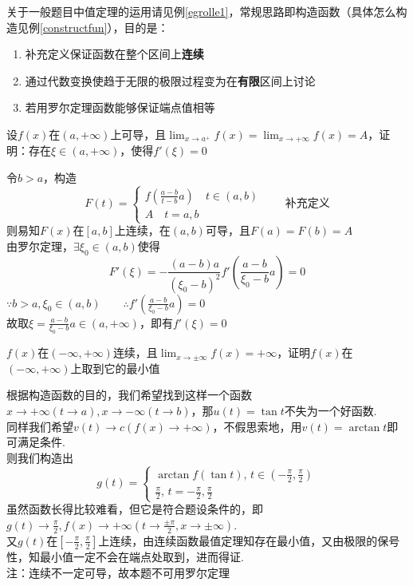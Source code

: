 关于一般题目中值定理的运用请见例\ref{egrolle1}，常规思路即构造函数（具体怎么构造见例\ref{constructfun}），目的是：
\begin{enumerate}
	\item 补充定义保证函数在整个区间上\textbf{连续}
	\item 通过代数变换使趋于无限的极限过程变为在\textbf{有限}区间上讨论
	\item 若用罗尔定理函数能够保证端点值相等
\end{enumerate}
\begin{example}
\label{egrolle1}
设$f(x)$在$(a,+\infty)$上可导，且$\displaystyle\lim_{x\to a^+}f(x)=\lim_{x\to +\infty}f(x)=A$，证明：存在$\xi\in(a,+\infty)$，使得$f'(\xi)=0$
\end{example}
\begin{analysis}
令$b>a$，构造
\[F(t)=\begin{cases}
\displaystyle f(\frac{a-b}{t-b}a)\quad t\in(a,b)\\
A\quad t=a,b
\end{cases}\qquad\mbox{补充定义}\]
则易知$F(x)$在$[a,b]$上连续，在$(a,b)$可导，且$F(a)=F(b)=A$\\
由罗尔定理，$\exists\xi_0\in(a,b)$使得
\[F'(\xi)=-\frac{(a-b)a}{(\xi_0-b)^2}f'(\frac{a-b}{\xi_0-b}a)=0\]
$\because b>a,\xi_0\in(a,b)\qquad\displaystyle\therefore f'(\frac{a-b}{\xi_0-b}a)=0$\\
故取$\displaystyle\xi=\frac{a-b}{\xi_0-b}a\in(a,+\infty)$，即有$f'(\xi)=0$
\end{analysis}
\begin{example}
\label{constructfun}
$f(x)$在$(-\infty,+\infty)$连续，且$\displaystyle\lim_{x\to\pm \infty}f(x)=+\infty$，证明$f(x)$在$(-\infty,+\infty)$上取到它的最小值
\end{example}
\begin{analysis}
根据构造函数的目的，我们希望找到这样一个函数$x\to +\infty(t\to a),x\to -\infty(t\to b)$，那$u(t)=\tan t$不失为一个好函数.\\
同样我们希望$v(t)\to c(f(x)\to +\infty)$，不假思索地，用$v(t)=\arctan t$即可满足条件.\\
则我们构造出
\[g(t)=\begin{cases}
\displaystyle\arctan f(\tan t),\,t\in(-\frac{\pi}{2},\frac{\pi}{2})\\
\displaystyle\frac{\pi}{2},\,t=-\frac{\pi}{2},\frac{\pi}{2}
\end{cases}\]
虽然函数长得比较难看，但它是符合题设条件的，即$\displaystyle g(t)\to \frac{\pi}{2},f(x)\to+\infty(t\to \frac{\pm\pi}{2},x\to \pm\infty)$.\\
又$g(t)$在$\displaystyle[-\frac{\pi}{2},\frac{\pi}{2}]$上连续，由连续函数最值定理知存在最小值，又由极限的保号性，知最小值一定不会在端点处取到，进而得证.\\
注：连续不一定可导，故本题不可用罗尔定理
\end{analysis}
